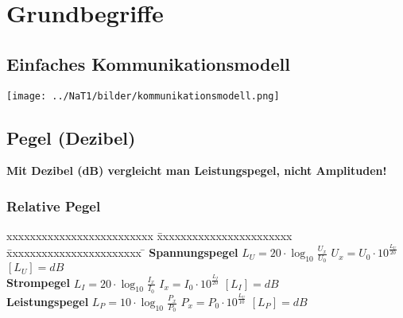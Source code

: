 \newcommand{\titleinfo}{Nachrichtentechnik 1 - Formelsammlung}
\newcommand{\authorinfo}{Braun \& Co, J.Rast}
\newcommand{\versioninfo}{$Revision: 1 $ - powered by \LaTeX}

%


 
 

\section{Grundbegriffe}
\subsection{Einfaches Kommunikationsmodell}
\begin{center}
	\texttt{[image: ../NaT1/bilder/kommunikationsmodell.png]}
\end{center}



\subsection{Pegel (Dezibel)}
\textbf{Mit Dezibel (dB) vergleicht man Leistungspegel, nicht Amplituden!}

\subsubsection{Relative Pegel}
	\begin{tabbing}
	xxxxxxxxxxxxxxxxxxxxxxxxx \= xxxxxxxxxxxxxxxxxxxxxxx  \= xxxxxxxxxxxxxxxxxxxxxxx \=\kill
	\textbf{Spannungspegel} \> $L_U = 20 \cdot \log_{10} \frac{U_x}{U_0}$ \> $U_x = U_0 \cdot
	10^{\frac{L_U}{20}} $ \> $[L_U] = dB$ \\ 
	\textbf{Strompegel} \> $L_I  = 20 \cdot \log_{10} \frac{I_x}{I_0}$ \> $I_x = I_0 \cdot
	10^{\frac{L_I}{20}} $ \> $[L_I] = dB$ \\ 
	\textbf{Leistungspegel} \> $L_P = 10 \cdot \log_{10} \frac{P_x}{P_0}$ \> $P_x = P_0 \cdot
	10^{\frac{L_U}{10}} $ \> $[L_P] = dB$
	\end{tabbing}

